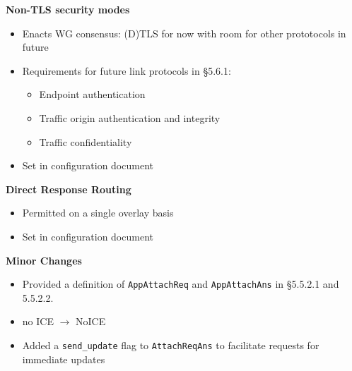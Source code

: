 \documentclass[helvetica]{seminar}
\newcommand{\heading}[1]{%
  \begin{center} 
    \large\bf 
    #1 
  \end{center} 
  \vspace{.4 in}}
\begin{document}
\begin{slide}
\heading{Non-TLS security modes}

\begin{itemize}
\item Enacts WG consensus: (D)TLS for now with room for other
  prototocols in future
\item Requirements for future link protocols in \S 5.6.1:
\begin{itemize}
\item Endpoint authentication
\item Traffic origin authentication and integrity
\item Traffic confidentiality
\end{itemize}
\item Set in configuration document
\end{itemize}

\end{slide}


\begin{slide}
\heading{Direct Response Routing}

\begin{itemize}
\item Permitted on a single overlay basis
\item Set in configuration document
\end{itemize}
\end{slide}



\begin{slide}
\heading{Minor Changes}

\begin{itemize}
\item Provided a definition of \verb^AppAttachReq^ and \verb^AppAttachAns^ in \S 5.5.2.1 and 5.5.2.2.
\item no ICE $\rightarrow$ NoICE
\item Added a \verb^send_update^ flag to \verb^AttachReqAns^ to facilitate
  requests for immediate updates
\end{itemize}
\end{slide}
\end{document}

